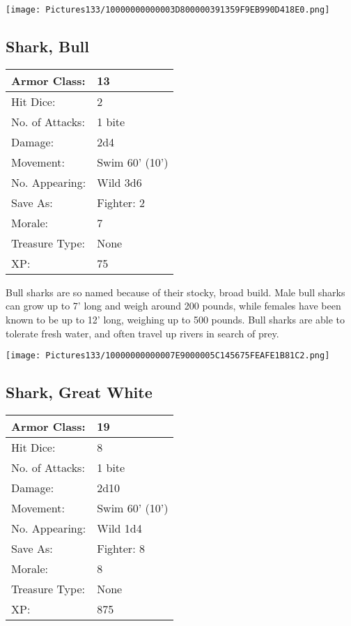\documentclass[a4paper,twoside,openany,10pt]{book}
\begin{document}
\begin{multicols}{2}
\begin{center} \texttt{[image: Pictures133/10000000000003D800000391359F9EB990D418E0.png]} \end{center}


\subsection*{Shark, Bull}\label{shark-bull}

\begin{tabularx}{0.50\textwidth}{@{}lX@{}}
Armor Class: & 13 \\\hline
Hit Dice: & 2 \\\hline
No. of Attacks: & 1 bite \\\hline
Damage: & 2d4 \\\hline
Movement: & Swim 60' (10') \\\hline
No. Appearing: & Wild 3d6 \\\hline
Save As: & Fighter: 2 \\\hline
Morale: & 7 \\\hline
Treasure Type: & None \\\hline
XP: & 75 \\\hline
\end{tabularx}\medskip

Bull sharks are so named because of their stocky, broad build. Male bull sharks can grow up to 7' long and weigh around 200 pounds, while females have been known to be up to 12' long, weighing up to 500 pounds. Bull sharks are able to tolerate fresh water, and often travel up rivers in search of prey.

\begin{center} \texttt{[image: Pictures133/10000000000007E9000005C145675FEAFE1B81C2.png]} \end{center}

\subsection*{Shark, Great White}\label{shark-great-white}

\begin{tabularx}{0.50\textwidth}{@{}lX@{}}
Armor Class: & 19 \\\hline
Hit Dice: & 8 \\\hline
No. of Attacks: & 1 bite \\\hline
Damage: & 2d10 \\\hline
Movement: & Swim 60' (10') \\\hline
No. Appearing: & Wild 1d4 \\\hline
Save As: & Fighter: 8 \\\hline
Morale: & 8 \\\hline
Treasure Type: & None \\\hline
XP: & 875 \\\hline
\end{tabularx}


\end{multicols}
\end{document}
